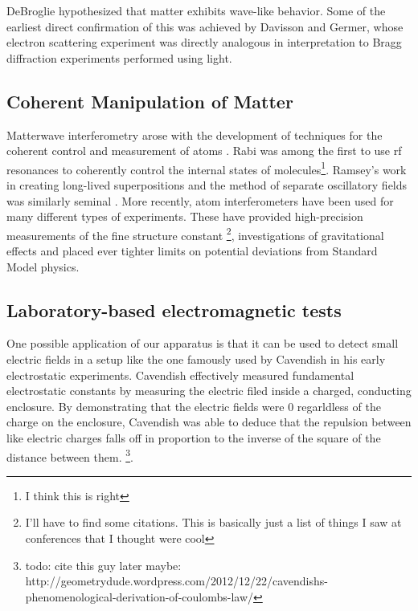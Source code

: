 DeBroglie hypothesized that matter exhibits wave-like behavior. Some of the earliest direct confirmation of this was achieved by Davisson and Germer, whose electron scattering experiment was directly analogous in interpretation to Bragg diffraction experiments performed using light. 

\subsection{Coherent Manipulation of Matter}
Matterwave interferometry arose with the development of techniques for the coherent control and measurement of atoms \cite{Kronin_RMP}. Rabi was among the first to use rf resonances to coherently control the internal states of molecules\footnote{I think this is right}. Ramsey's work in creating long-lived superpositions and the method of separate oscillatory fields was similarly seminal \cite{Kronin_RMP}. 
More recently, atom interferometers have been used for many different types of experiments. These have provided high-precision measurements of the fine structure constant \footnote{I'll have to find some citations. This is basically just a list of things I saw at conferences that I thought were cool}, investigations of gravitational effects and placed ever tighter limits on potential deviations from Standard Model physics. 

\subsection{Laboratory-based electromagnetic tests}

One possible application of our apparatus is that it can be used  to detect small electric fields in a setup like the one famously used by Cavendish in his early electrostatic experiments. Cavendish effectively measured fundamental electrostatic constants by measuring the electric filed inside a charged, conducting enclosure. By demonstrating that the electric fields were 0 regarldless of the charge on the enclosure, Cavendish was able to deduce that the repulsion between like electric charges falls off in proportion to the inverse of the square of the distance between them. \footnote{todo: cite this guy later maybe:  http://geometrydude.wordpress.com/2012/12/22/cavendishs-phenomenological-derivation-of-coulombs-law/}. 

